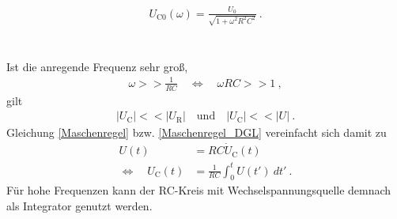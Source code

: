 \begin{align}
	U_{\text{C}0}(\omega) = \frac{U_0}{\sqrt{1+\omega^2R^2C^2}} \ .
	\label{eq:amplitude}
\end{align} \\
\ \\
Ist die anregende Frequenz sehr groß, 
\begin{align}
	\omega >> \frac{1}{RC} \quad\Leftrightarrow\quad \omega RC >> 1 \ ,
\end{align}
gilt
\begin{align}
	|U_\text{C}| << |U_\text{R}| \quad \text{und} \quad |U_\text{C}| << |U| \ .
\end{align}
Gleichung \eqref{Maschenregel} bzw. \eqref{Maschenregel_DGL} vereinfacht sich damit zu
\begin{align}
	U(t) &= RC\dot{U}_\text{C}(t) \\
	\Leftrightarrow\quad U_\text{C}(t) &= \frac{1}{RC}\int_0^t U(t')\ dt' \ .
\end{align}
Für hohe Frequenzen kann der RC-Kreis mit Wechselspannungsquelle demnach als Integrator genutzt werden.